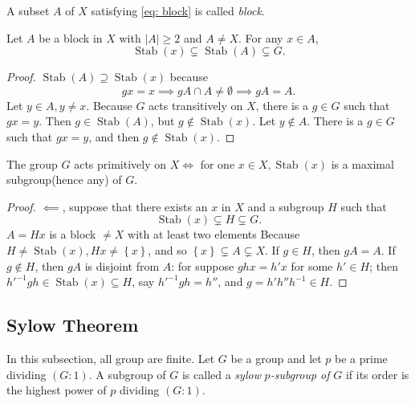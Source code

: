 \begin{definition}
  A subset \( A \) of \( X \) satisfying \eqref{eq: block} is called \emph{block}.
\end{definition}

\begin{proposition}
  Let \( A \) be a block in \( X \) with \( \left\vert A \right\vert \geq 2 \) and \( A \neq X \).
  For any \( x \in A \),
  \[
    \operatorname{Stab}(x) \subsetneq \operatorname{Stab}(A) \subsetneq G.
  \]
\end{proposition}
\begin{proof}
  \( \operatorname{Stab}(A) \supseteq \operatorname{Stab}(x) \) because
  \[
    gx = x \implies gA \cap A \neq \emptyset \implies gA = A.
  \]
  Let \( y \in A, y \neq x \).
  Because \( G \) acts transitively on \( X \), there is a \( g \in G \) such that \( gx = y \).
  Then \( g \in \operatorname{Stab}(A) \), but \( g \notin \operatorname{Stab}(x) \).
  Let \( y \notin A \).
  There is a \( g \in G \) such that \( gx = y \), and then \( g \notin \operatorname{Stab}(x) \).
\end{proof}

\begin{theorem}
  The group \( G \) acts primitively on \( X \iff \) for one \( x \in X, \operatorname{Stab}(x) \) is a maximal subgroup(hence any) of \( G \).
\end{theorem}
\begin{proof}
  \( \impliedby \), suppose that there exists an \( x \) in \( X \) and a subgroup \( H \) such that
  \[
    \operatorname{Stab}(x) \subsetneq H \subsetneq G.
  \]
    \( A = Hx \) is a block \( \neq X \) with at least two elements
    Because \( H \neq \operatorname{Stab}(x), Hx \neq \left\lbrace x \right\rbrace \), and so \( \left\lbrace x \right\rbrace \subsetneq A \subsetneq X \).
    If \( g \in H \), then \( gA = A \).
    If \( g \notin H \), then \( gA \) is disjoint from \( A \): for suppose \( ghx = h' x \) for some \( h' \in H \);
    then \( h'^{-1}gh \in \operatorname{Stab}(x) \subseteq H \), say \( h'^{-1}gh = h'' \), and \( g = h'h''h^{-1} \in H \).
\end{proof}

\subsection{Sylow Theorem}

In this subsection, all group are finite.
Let \( G \) be a group and let \( p \) be a prime dividing \( (G: 1) \).
A subgroup of \( G \) is called a \emph{sylow} \emph{\( p \)-subgroup of} \( G \) if its order is the highest power of \( p \) dividing \( (G: 1) \).

